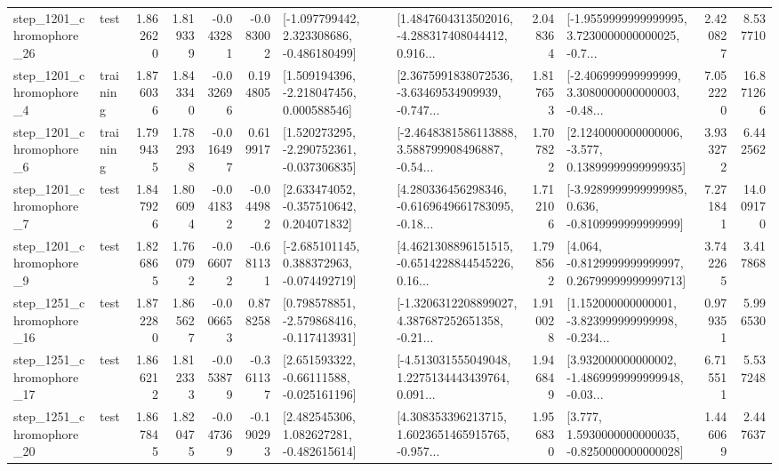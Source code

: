 \begin{tabular}{llrrrrllrlrr}
 step\_1201\_chromophore\_26 &      test &      1.862620 &    1.819339 &     -0.043281 & -0.083002 &   [-1.097799442, 2.323308686, -0.486180499] &  [1.4847604313502016, -4.288317408044412, 0.916... &       2.048364 &  [-1.9559999999999995, 3.7230000000000025, -0.7... &            2.420827 &          8.537710 \\
  step\_1201\_chromophore\_4 &  training &      1.876036 &    1.843340 &     -0.032696 &  0.194805 &    [1.509194396, -2.218047456, 0.000588546] &  [2.3675991838072536, -3.63469534909939, -0.747... &       1.817653 &  [-2.406999999999999, 3.3080000000000003, -0.48... &            7.052220 &         16.871266 \\
  step\_1201\_chromophore\_6 &  training &      1.799435 &    1.782938 &     -0.016497 &  0.619917 &   [1.520273295, -2.290752361, -0.037306835] &  [-2.4648381586113888, 3.588799908496887, -0.54... &       1.707822 &  [2.1240000000000006, -3.577, 0.13899999999999935] &            3.933272 &          6.442562 \\
  step\_1201\_chromophore\_7 &      test &      1.847926 &    1.806094 &     -0.041832 & -0.044982 &    [2.633474052, -0.357510642, 0.204071832] &  [4.280336456298346, -0.6169649661783095, -0.18... &       1.712106 &  [-3.9289999999999985, 0.636, -0.8109999999999999] &            7.271841 &         14.009170 \\
  step\_1201\_chromophore\_9 &      test &      1.826865 &    1.760792 &     -0.066072 & -0.681131 &   [-2.685101145, 0.388372963, -0.074492719] &  [4.4621308896151515, -0.6514228844545226, 0.16... &       1.798562 &  [4.064, -0.8129999999999997, 0.26799999999999713] &            3.742265 &          3.417868 \\
 step\_1251\_chromophore\_16 &      test &      1.872280 &    1.865627 &     -0.006653 &  0.878258 &   [0.798578851, -2.579868416, -0.117413931] &  [-1.3206312208899027, 4.387687252651358, -0.21... &       1.910028 &  [1.152000000000001, -3.823999999999998, -0.234... &            0.979351 &          5.996530 \\
 step\_1251\_chromophore\_17 &      test &      1.866212 &    1.812333 &     -0.053879 & -0.361137 &    [2.651593322, -0.66111588, -0.025161196] &  [-4.513031555049048, 1.2275134443439764, 0.091... &       1.946849 &  [3.932000000000002, -1.4869999999999948, -0.03... &            6.715511 &          5.537248 \\
 step\_1251\_chromophore\_20 &      test &      1.867845 &    1.820475 &     -0.047369 & -0.190293 &    [2.482545306, 1.082627281, -0.482615614] &  [4.308353396213715, 1.6023651465915765, -0.957... &       1.956830 &   [3.777, 1.5930000000000035, -0.8250000000000028] &            1.446069 &          2.447637 \\

\end{tabular}
